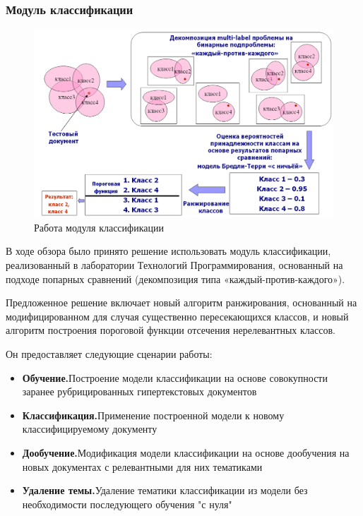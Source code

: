 \documentclass[russian, utf8, emptystyle]{eskdtext}
\begin{document}
\subsubsection{Модуль классификации}
\begin{figure}[h]
	\begin{center}
		\includegraphics[width=14cm]{pic/module.png}
		\caption{Работа модуля классификации}
		\label{fig:low_sigma}
	\end{center}
\end{figure}
В ходе обзора было принято решение использовать модуль классификации, реализованный в лаборатории Технологий Программирования, основанный на подходе попарных сравнений (декомпозиция типа «каждый-против-каждого»). 

Предложенное решение включает новый алгоритм ранжирования, основанный на модифицированном для случая существенно пересекающихся классов, и новый алгоритм построения пороговой функции отсечения нерелевантных классов. 

Он предоставляет следующие сценарии работы:
\begin{itemize}
	\item {\bf Обучение.}Построение модели классификации на основе совокупности заранее рубрицированных гипертекстовых документов
	
	\item {\bf Классификация.}Применение построенной модели к новому классифицируемому документу
	\item {\bf Дообучение.}Модификация модели классификации на основе дообучения на новых документах с релевантными для них тематиками
	\item {\bf Удаление темы.}Удаление тематики классификации из модели без необходимости последующего обучения "с нуля"
\end{itemize}
\end{document}
